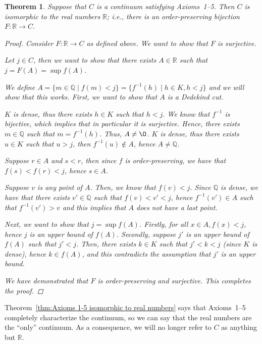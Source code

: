 \documentclass[11pt]{article}
\newcommand{\bbQ}{\mathbb{Q}}
\newcommand{\bbR}{\mathbb{R}}
\renewcommand{\emptyset}{\O}
\newcommand{\arr}{\longrightarrow}
\newtheorem{theorem}{Theorem}[section]
\theoremstyle{definition}
\numberwithin{equation}{subsection}
\begin{document}
\begin{theorem}\label{6.18}
	Suppose that $C$ is a continuum satisfying Axioms~1--5. Then $C$ is isomorphic to the real numbers $\bbR$; i.e.,
	there is an order-preserving bijection $F\colon \bbR \arr C$.
	\label{thm:Axioms 1-5 isomorphic to real numbers}
\begin{proof}
Consider $F\colon \bbR \rightarrow C$ as defined above. We want to show that $F$ is surjective.

Let $j \in C$, then we want to show that there exists $A \in \bbR$ such that $j=F(A)=\sup f(A)$. 

We define $A = \{m \in \bbQ \mid f(m)<j\} = \{f^{-1}(h) \mid h \in K, h<j\}$ and we will show that this works. First, we want to show that $A$ is a Dedekind cut.

$K$ is dense, thus there exists $h \in K$ such that $h<j$. We know that $f^{-1}$ is bijective, which implies that in particular it is surjective. Hence, there exists $m \in \bbQ$ such that $m = f^{-1}(h)$. Thus, $A \neq \emptyset$. $K$ is dense, thus there exists $u \in K$ such that $u>j$, then $f^{-1}(u) \notin A$, hence $A \neq \bbQ$.

Suppose $r \in A$ and $s<r$, then since $f$ is order-preserving, we have that $f(s)<f(r)<j$, hence $s \in A$.

Suppose $v$ is any point of $A$. Then, we know that $f(v)<j$. Since $\bbQ$ is dense, we have that there exists $v' \in \bbQ$ such that $f(v)<v'<j$, hence $f^{-1}(v') \in A$ such that $f^{-1}(v') > v$ and this implies that $A$ does not have a last point.

Next, we want to show that $j = \sup f(A)$. Firstly, for all $x \in A, f(x)<j$, hence $j$ is an upper bound of $f(A)$. Secondly, suppose $j'$ is an upper bound of $f(A)$ such that $j'<j$. Then, there exists $k \in K$ such that $j'<k<j$ (since $K$ is dense), hence $k \in f(A)$, and this contradicts the assumption that $j'$ is an upper bound.

We have demonstrated that $F$ is order-preserving and surjective. This completes the proof.

\renewcommand\qedsymbol{QED}
\end{proof}
\end{theorem}



Theorem~\ref{thm:Axioms 1-5 isomorphic to real numbers} says that Axioms~1--5 completely characterize the continuum, so we can say that the real numbers are the ``only'' continuum. As a consequence, we will no longer refer to $C$ as anything but $\bbR$. 
\end{document}
